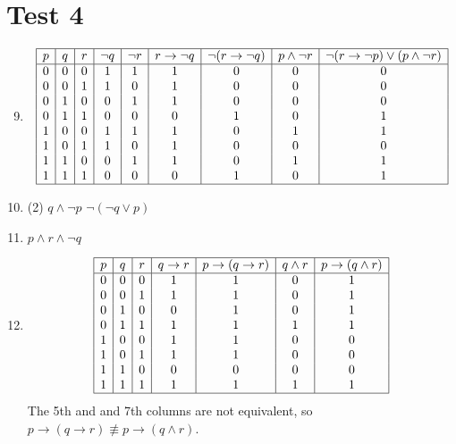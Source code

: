 \documentclass[12pt]{article}
\newcommand{\enumset}[1]{\setcounter{enumi}{#1}}
\begin{document}
	\section*{Test 4}
		\begin{enumerate}
			\enumset{8}
			\item
				\[\begin{array}{|*{9}{c|}}\hline
					p & q & r& \lnot q & \lnot r & r \to \lnot q & \lnot(r \to \lnot q) & p \land \lnot r & \lnot(r \to \lnot p) \lor (p \land \lnot r) \\\hline
					0 & 0 & 0 & 1 & 1 & 1 & 0 & 0 & 0 \\
					0 & 0 & 1 & 1 & 0 & 1 & 0 & 0 & 0 \\
					0 & 1 & 0 & 0 & 1 & 1 & 0 & 0 & 0 \\
					0 & 1 & 1 & 0 & 0 & 0 & 1 & 0 & 1 \\
					1 & 0 & 0 & 1 & 1 & 1 & 0 & 1 & 1 \\
					1 & 0 & 1 & 1 & 0 & 1 & 0 & 0 & 0 \\
					1 & 1 & 0 & 0 & 1 & 1 & 0 & 1 & 1 \\
					1 & 1 & 1 & 0 & 0 & 0 & 1 & 0 & 1 \\\hline
				\end{array}\]
			\item
				\begin{tasks}(2)
					\task
						\(q \land \lnot p\)	
					\task
						\(\lnot(\lnot q \lor p)\)
				\end{tasks}
			\item
				\(p \land r \land \lnot q\)
			\enumset{14}
			\item
				\[\begin{array}{|*{8}{c|}}\hline
					p & q & r & q \to r & p \to (q \to r)  & q \land r & p \to (q \land r) \\\hline
					0 & 0 & 0 & 1 & 1 & 0 & 1 \\
					0 & 0 & 1 & 1 & 1 & 0 & 1 \\
					0 & 1 & 0 & 0 & 1 & 0 & 1 \\
					0 & 1 & 1 & 1 & 1 & 1 & 1 \\
					1 & 0 & 0 & 1 & 1 & 0 & 0 \\
					1 & 0 & 1 & 1 & 1 & 0 & 0 \\
					1 & 1 & 0 & 0 & 0 & 0 & 0 \\
					1 & 1 & 1 & 1 & 1 & 1 & 1 \\\hline
				\end{array}\]
				The 5th and and 7th columns are not equivalent, so \(p \to (q \to r) \not\equiv p \to (q \land r)\).

\end{enumerate}
\end{document}
